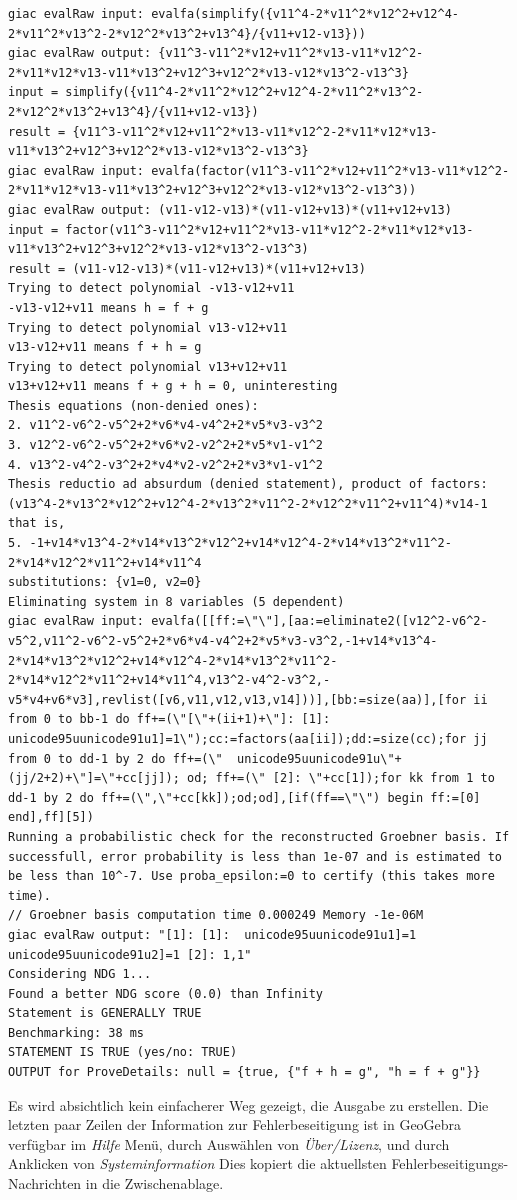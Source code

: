 \documentclass{article}
\begin{document}
{\begin{lstlisting}[language=mylog]
giac evalRaw input: evalfa(simplify({v11^4-2*v11^2*v12^2+v12^4-2*v11^2*v13^2-2*v12^2*v13^2+v13^4}/{v11+v12-v13}))
giac evalRaw output: {v11^3-v11^2*v12+v11^2*v13-v11*v12^2-2*v11*v12*v13-v11*v13^2+v12^3+v12^2*v13-v12*v13^2-v13^3}
input = simplify({v11^4-2*v11^2*v12^2+v12^4-2*v11^2*v13^2-2*v12^2*v13^2+v13^4}/{v11+v12-v13})
result = {v11^3-v11^2*v12+v11^2*v13-v11*v12^2-2*v11*v12*v13-v11*v13^2+v12^3+v12^2*v13-v12*v13^2-v13^3}
giac evalRaw input: evalfa(factor(v11^3-v11^2*v12+v11^2*v13-v11*v12^2-2*v11*v12*v13-v11*v13^2+v12^3+v12^2*v13-v12*v13^2-v13^3))
giac evalRaw output: (v11-v12-v13)*(v11-v12+v13)*(v11+v12+v13)
input = factor(v11^3-v11^2*v12+v11^2*v13-v11*v12^2-2*v11*v12*v13-v11*v13^2+v12^3+v12^2*v13-v12*v13^2-v13^3)
result = (v11-v12-v13)*(v11-v12+v13)*(v11+v12+v13)
Trying to detect polynomial -v13-v12+v11
-v13-v12+v11 means h = f + g
Trying to detect polynomial v13-v12+v11
v13-v12+v11 means f + h = g
Trying to detect polynomial v13+v12+v11
v13+v12+v11 means f + g + h = 0, uninteresting
Thesis equations (non-denied ones):
2. v11^2-v6^2-v5^2+2*v6*v4-v4^2+2*v5*v3-v3^2
3. v12^2-v6^2-v5^2+2*v6*v2-v2^2+2*v5*v1-v1^2
4. v13^2-v4^2-v3^2+2*v4*v2-v2^2+2*v3*v1-v1^2
Thesis reductio ad absurdum (denied statement), product of factors:
(v13^4-2*v13^2*v12^2+v12^4-2*v13^2*v11^2-2*v12^2*v11^2+v11^4)*v14-1
that is,
5. -1+v14*v13^4-2*v14*v13^2*v12^2+v14*v12^4-2*v14*v13^2*v11^2-2*v14*v12^2*v11^2+v14*v11^4
substitutions: {v1=0, v2=0}
Eliminating system in 8 variables (5 dependent)
giac evalRaw input: evalfa([[ff:=\"\"],[aa:=eliminate2([v12^2-v6^2-v5^2,v11^2-v6^2-v5^2+2*v6*v4-v4^2+2*v5*v3-v3^2,-1+v14*v13^4-2*v14*v13^2*v12^2+v14*v12^4-2*v14*v13^2*v11^2-2*v14*v12^2*v11^2+v14*v11^4,v13^2-v4^2-v3^2,-v5*v4+v6*v3],revlist([v6,v11,v12,v13,v14]))],[bb:=size(aa)],[for ii from 0 to bb-1 do ff+=(\"[\"+(ii+1)+\"]: [1]:  unicode95uunicode91u1]=1\");cc:=factors(aa[ii]);dd:=size(cc);for jj from 0 to dd-1 by 2 do ff+=(\"  unicode95uunicode91u\"+(jj/2+2)+\"]=\"+cc[jj]); od; ff+=(\" [2]: \"+cc[1]);for kk from 1 to dd-1 by 2 do ff+=(\",\"+cc[kk]);od;od],[if(ff==\"\") begin ff:=[0] end],ff][5])
Running a probabilistic check for the reconstructed Groebner basis. If successfull, error probability is less than 1e-07 and is estimated to be less than 10^-7. Use proba_epsilon:=0 to certify (this takes more time).
// Groebner basis computation time 0.000249 Memory -1e-06M
giac evalRaw output: "[1]: [1]:  unicode95uunicode91u1]=1  unicode95uunicode91u2]=1 [2]: 1,1"
Considering NDG 1...
Found a better NDG score (0.0) than Infinity
Statement is GENERALLY TRUE
Benchmarking: 38 ms
STATEMENT IS TRUE (yes/no: TRUE)
OUTPUT for ProveDetails: null = {true, {"f + h = g", "h = f + g"}}
\end{lstlisting}
} %
Es wird absichtlich kein einfacherer Weg gezeigt, die Ausgabe zu erstellen. Die letzten paar Zeilen der Information zur Fehlerbeseitigung ist in GeoGebra verfügbar im \textit{Hilfe} Menü, durch Auswählen von \textit{Über/Lizenz}, und durch Anklicken von \textit{Systeminformation} Dies kopiert die aktuellsten Fehlerbeseitigungs-Nachrichten in die Zwischenablage.
\end{document}
